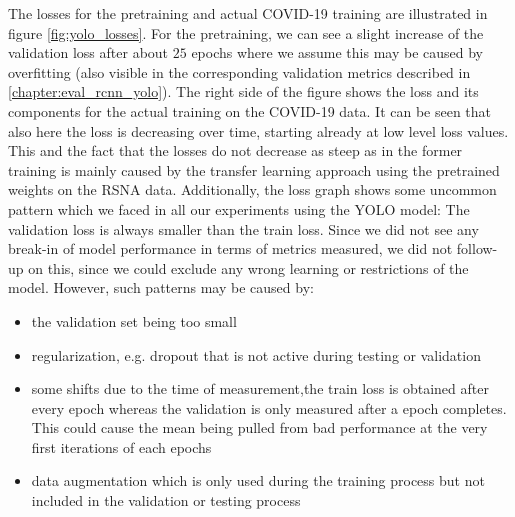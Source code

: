 The losses for the pretraining and actual COVID-19 training are illustrated in figure \ref{fig:yolo_losses}. For the pretraining, we can see a slight increase of the validation loss after about $25$ epochs where we assume this may be caused by overfitting (also visible in the corresponding validation metrics described in \ref{chapter:eval_rcnn_yolo}). The right side of the figure shows the loss and its components for the actual training on the COVID-19 data. It can be seen that also here the loss is decreasing over time, starting already at low level loss values. This and the fact that the losses do not decrease as steep as in the former training is mainly caused by the transfer learning approach using the pretrained weights on the \ac{RSNA} data.
Additionally, the loss graph shows some uncommon pattern which we faced in all our experiments using the \ac{YOLO} model: The validation loss is always smaller than the train loss. Since we did not see any break-in of model performance in terms of metrics measured, we did not follow-up on this, since we could exclude any wrong learning or restrictions of the model. However, such patterns may be caused by:
\begin{itemize}
	\item the validation set being too small
	\item regularization, e.g. dropout that is not active during testing or validation
	\item some shifts due to the time of measurement,the train loss is obtained after every epoch whereas the validation is only measured after a epoch completes. This could cause the mean being pulled from bad performance at the very first iterations of each epochs
	\item data augmentation which is only used during the training process but not included in the validation or testing process
\end{itemize}

